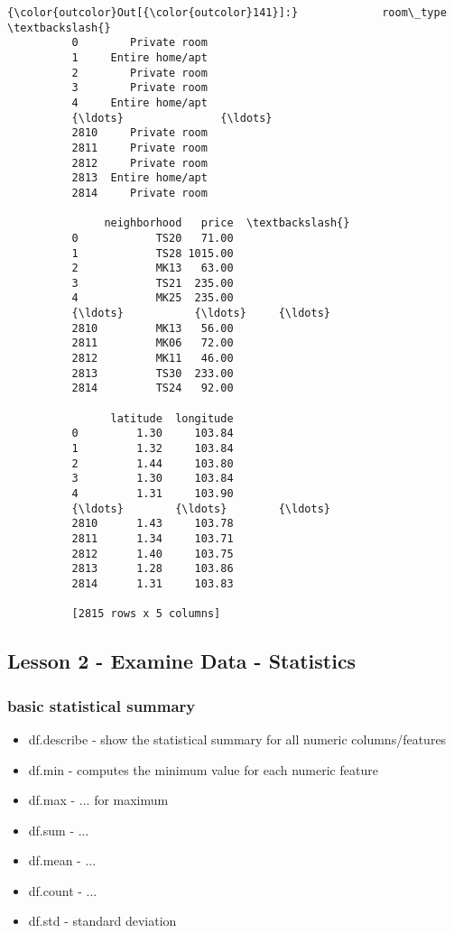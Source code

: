 \documentclass[11pt]{article}
\providecommand{\tightlist}{%
      \setlength{\itemsep}{0pt}\setlength{\parskip}{0pt}}
\begin{document}
\begin{Verbatim}[commandchars=\\\{\}]
{\color{outcolor}Out[{\color{outcolor}141}]:}             room\_type  \textbackslash{}
          0        Private room   
          1     Entire home/apt   
          2        Private room   
          3        Private room   
          4     Entire home/apt   
          {\ldots}               {\ldots}   
          2810     Private room   
          2811     Private room   
          2812     Private room   
          2813  Entire home/apt   
          2814     Private room   
          
               neighborhood   price  \textbackslash{}
          0            TS20   71.00   
          1            TS28 1015.00   
          2            MK13   63.00   
          3            TS21  235.00   
          4            MK25  235.00   
          {\ldots}           {\ldots}     {\ldots}   
          2810         MK13   56.00   
          2811         MK06   72.00   
          2812         MK11   46.00   
          2813         TS30  233.00   
          2814         TS24   92.00   
          
                latitude  longitude  
          0         1.30     103.84  
          1         1.32     103.84  
          2         1.44     103.80  
          3         1.30     103.84  
          4         1.31     103.90  
          {\ldots}        {\ldots}        {\ldots}  
          2810      1.43     103.78  
          2811      1.34     103.71  
          2812      1.40     103.75  
          2813      1.28     103.86  
          2814      1.31     103.83  
          
          [2815 rows x 5 columns]
\end{Verbatim}
            
    \subsection{Lesson 2 - Examine Data -
Statistics}\label{lesson-2---examine-data---statistics}

    \subsubsection{basic statistical
summary}\label{basic-statistical-summary}

\begin{itemize}
\tightlist
\item
  df.describe - show the statistical summary for all numeric
  columns/features
\item
  df.min - computes the minimum value for each numeric feature
\item
  df.max - ... for maximum
\item
  df.sum - ...
\item
  df.mean - ...
\item
  df.count - ...
\item
  df.std - standard deviation
\end{itemize}
\end{document}
